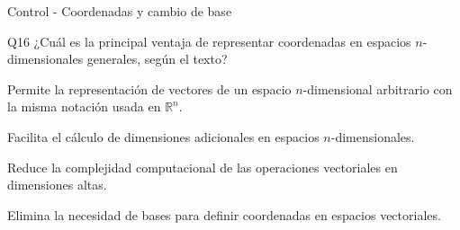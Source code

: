 \documentclass[a4,11pt]{aleph-notas}
\begin{document}
\begin{quiz}{Control - Coordenadas y cambio de base}
\begin{multi}[]{Q16}
    ¿Cuál es la principal ventaja de representar coordenadas en espacios $n$-dimensionales generales, según el texto?
    \item* Permite la representación de vectores de un espacio $n$-dimensional arbitrario con la misma notación usada en $\mathbb{R}^n$.
    \item Facilita el cálculo de dimensiones adicionales en espacios $n$-dimensionales.
    \item Reduce la complejidad computacional de las operaciones vectoriales en dimensiones altas.
    \item Elimina la necesidad de bases para definir coordenadas en espacios vectoriales.
\end{multi}


\end{quiz}
\end{document}

